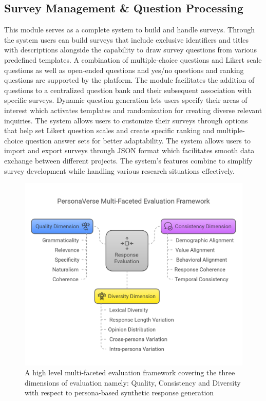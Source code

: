 \documentclass[11pt]{article}
\begin{document}
\subsection{Survey Management \& Question Processing}
This module serves as a complete system to build and handle surveys. Through the system users can build surveys that include exclusive identifiers and titles with descriptions alongside the capability to draw survey questions from various predefined templates. A combination of multiple-choice questions and Likert scale questions as well as open-ended questions and yes/no questions and ranking questions are supported by the platform. The module facilitates the addition of questions to a centralized question bank and their subsequent association with specific surveys. Dynamic question generation lets users specify their areas of interest which activates templates and randomization for creating diverse relevant inquiries. The system allows users to customize their surveys through options that help set Likert question scales and create specific ranking and multiple-choice question answer sets for better adaptability. The system allows users to import and export surveys through JSON format which facilitates smooth data exchange between different projects. The system's features combine to simplify survey development while handling various research situations effectively.
\begin{figure}[t]
  \includegraphics[width=\columnwidth]{latex//assets/PersonaVerse Multi-Faceted Evaluation Framework.png}
  \caption{A high level multi-faceted evaluation framework covering the three dimensions of evaluation namely: Quality, Consistency and Diversity with respect to persona-based synthetic response generation}
\end{figure}
\end{document}
